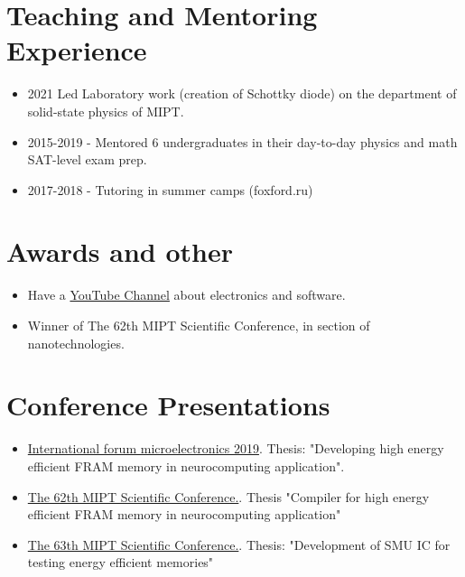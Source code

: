 \documentclass{article}
\begin{document}
\section{Teaching and Mentoring Experience }
\begin{itemize}
\item 2021 Led Laboratory work (creation of Schottky diode) on the department of solid-state physics of MIPT. 
\item 2015-2019 - Mentored 6 undergraduates in their day-to-day physics and math SAT-level exam prep.
\item 2017-2018 - Tutoring in summer camps (foxford.ru)
\end{itemize}
 
\section{Awards and other}
\begin{itemize}
\item Have a \href{https://www.youtube.com/channel/UCAjmXQnYQjWoVHx6NIo24CQ}{YouTube Channel} about electronics and software.   
\item Winner of The 62th MIPT Scientific Conference, in section of nanotechnologies.
\end{itemize}
 
\section{Conference Presentations }
 
\begin{itemize}
\item \href{https://microelectronica.pro/}{International forum microelectronics 2019}. Thesis: "Developing high energy efficient FRAM memory in neurocomputing application".
\item  \href{https://conf62.mipt.ru/}{The 62th MIPT Scientific Conference.}. Thesis "Compiler for high energy efficient FRAM memory in neurocomputing application"
\item \href{https://mipt.ru/science/5top100/education/courseproposal/%D0%A4%D0%AD%D0%A4%D0%9C.pdf}{The 63th MIPT Scientific Conference.}. Thesis: "Development of SMU IC for testing energy efficient memories"
\end{itemize}
 
 
\end{document}
